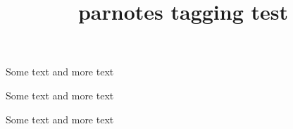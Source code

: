 \documentclass{article}
\title{parnotes tagging test}
\begin{document}
Some text and more text

\parnotes

\begin{autopn}
Some text and more text

Some text and more text
\end{autopn}

\end{document}
